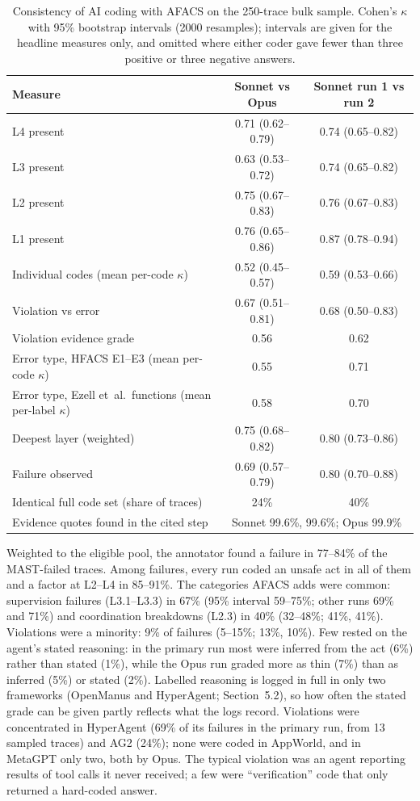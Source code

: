 \documentclass[10pt]{article}
\begin{document}
\begin{table}[tbp]
\centering
\caption{Consistency of AI coding with AFACS on the 250-trace bulk sample.
Cohen's $\kappa$ with 95\% bootstrap intervals (\num{2000} resamples); intervals are
given for the headline measures only, and omitted where either coder gave fewer
than three positive or three negative answers.}
\label{tab:rq3}
\small
\begin{tabular}{@{}lcc@{}}
\toprule
Measure & Sonnet vs Opus & Sonnet run 1 vs run 2\\
\midrule
L4 present & 0.71 (0.62--0.79) & 0.74 (0.65--0.82)\\
L3 present & 0.63 (0.53--0.72) & 0.74 (0.65--0.82)\\
L2 present & 0.75 (0.67--0.83) & 0.76 (0.67--0.83)\\
L1 present & 0.76 (0.65--0.86) & 0.87 (0.78--0.94)\\
Individual codes (mean per-code $\kappa$) & 0.52 (0.45--0.57) & 0.59 (0.53--0.66)\\
Violation vs error & 0.67 (0.51--0.81) & 0.68 (0.50--0.83)\\
Violation evidence grade & 0.56 & 0.62\\
Error type, HFACS E1--E3 (mean per-code $\kappa$) & 0.55 & 0.71\\
Error type, Ezell et~al.\ functions (mean per-label $\kappa$) & 0.58 & 0.70\\
Deepest layer (weighted) & 0.75 (0.68--0.82) & 0.80 (0.73--0.86)\\
Failure observed & 0.69 (0.57--0.79) & 0.80 (0.70--0.88)\\
Identical full code set (share of traces) & 24\% & 40\%\\
Evidence quotes found in the cited step & \multicolumn{2}{c}{Sonnet 99.6\%, 99.6\%; Opus 99.9\%}\\
\bottomrule
\end{tabular}
\end{table}

Weighted to the eligible pool, the annotator found a failure in 77--84\% of the
MAST-failed traces. Among failures, every run coded an unsafe act in all of them
and a factor at L2--L4 in 85--91\%. The categories AFACS adds were common:
supervision failures (L3.1--L3.3) in 67\% (95\% interval 59--75\%; other runs 69\%
and 71\%) and coordination breakdowns (L2.3) in 40\% (32--48\%; 41\%, 41\%).
Violations were a minority: 9\% of failures (5--15\%; 13\%, 10\%). Few rested on the agent's stated reasoning: in the primary run most were inferred from the act (6\%) rather than stated (1\%), while the Opus run graded more as thin (7\%) than as
inferred (5\%) or stated (2\%). Labelled reasoning is logged in full in only two frameworks (OpenManus and HyperAgent; Section~5.2), so how often the stated grade can be given partly reflects what the logs record. Violations were concentrated in HyperAgent (69\% of its failures in the primary run, from 13 sampled traces) and AG2 (24\%); none were coded in AppWorld, and in
MetaGPT only two, both by Opus. The typical violation was an agent reporting
results of tool calls it never received; a few were ``verification'' code that only
returned a hard-coded answer.
\end{document}
